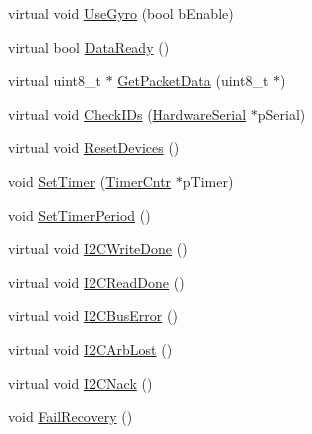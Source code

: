 \begin{DoxyCompactItemize}
virtual void \hyperlink{class_i_m_u_a86f05be645d2096f0b2b3cfbe8ea0ce8}{UseGyro} (bool bEnable)
\item 
virtual bool \hyperlink{class_i_m_u_a078d2f3ad27475c9afcaf09c44886e4c}{DataReady} ()
\item 
virtual uint8\_\-t $\ast$ \hyperlink{class_i_m_u_a4f72b7f99fc42f30c9478ba7ed65654e}{GetPacketData} (uint8\_\-t $\ast$)
\item 
virtual void \hyperlink{class_i_m_u_a74feb2946c48a92b251e28ac256d887b}{CheckIDs} (\hyperlink{class_hardware_serial}{HardwareSerial} $\ast$pSerial)
\item 
virtual void \hyperlink{class_i_m_u_a98f9a8244dd1a07f8771450097371b2c}{ResetDevices} ()
\item 
void \hyperlink{class_i_m_u_a66680475b844fbf334a0e4e7c5fe845b}{SetTimer} (\hyperlink{class_timer_cntr}{TimerCntr} $\ast$pTimer)
\item 
void \hyperlink{class_i_m_u_a3ce9934e64dff87e18b6cc3f3700f72f}{SetTimerPeriod} ()
\item 
virtual void \hyperlink{class_i_m_u_a71568969beb6ee7d4b596f8c0a91faf9}{I2CWriteDone} ()
\item 
virtual void \hyperlink{class_i_m_u_ab4124ae29a64365787c2c03b3ab09c6c}{I2CReadDone} ()
\item 
virtual void \hyperlink{class_i_m_u_aad041ec91d266e9fc15d22de17ffccad}{I2CBusError} ()
\item 
virtual void \hyperlink{class_i_m_u_a7d4a2a761fb4956ebd9ce0b0cda69556}{I2CArbLost} ()
\item 
virtual void \hyperlink{class_i_m_u_a161f80bfcb7195196754a18eddedaf12}{I2CNack} ()
\item 
void \hyperlink{class_i_m_u_acf8e9ee1971e527c255c046d3d3c1fe9}{FailRecovery} ()
\end{DoxyCompactItemize}
